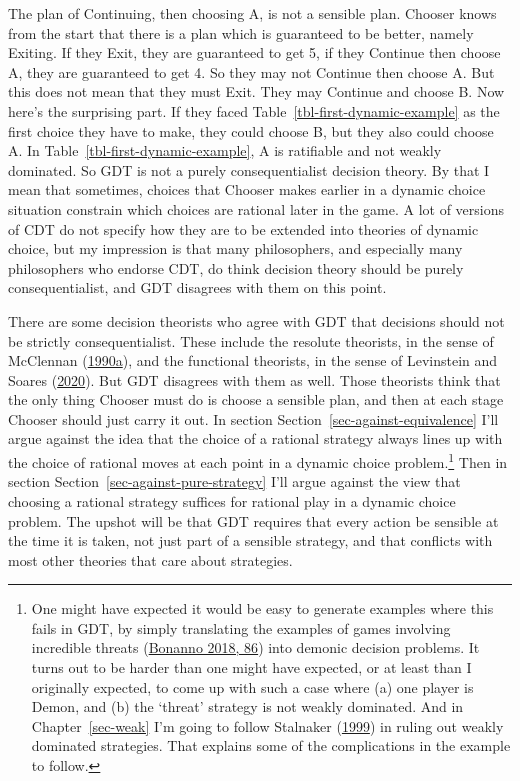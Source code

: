 \documentclass[
  12pt,
  letterpaper,
  DIV=11,
  numbers=noendperiod]{scrreprt}
\begin{document}
The plan of Continuing, then choosing A, is not a sensible plan. Chooser
knows from the start that there is a plan which is guaranteed to be
better, namely Exiting. If they Exit, they are guaranteed to get 5, if
they Continue then choose A, they are guaranteed to get 4. So they may
not Continue then choose A. But this does not mean that they must Exit.
They may Continue and choose B. Now here's the surprising part. If they
faced Table~\ref{tbl-first-dynamic-example} as the first choice they
have to make, they could choose B, but they also could choose A. In
Table~\ref{tbl-first-dynamic-example}, A is ratifiable and not weakly
dominated. So GDT is not a purely consequentialist decision theory. By
that I mean that sometimes, choices that Chooser makes earlier in a
dynamic choice situation constrain which choices are rational later in
the game. A lot of versions of CDT do not specify how they are to be
extended into theories of dynamic choice, but my impression is that many
philosophers, and especially many philosophers who endorse CDT, do think
decision theory should be purely consequentialist, and GDT disagrees
with them on this point.

There are some decision theorists who agree with GDT that decisions
should not be strictly consequentialist. These include the resolute
theorists, in the sense of McClennan
(\protect\hyperlink{ref-McClennan1990}{1990a}), and the functional
theorists, in the sense of Levinstein and Soares
(\protect\hyperlink{ref-LevinsteinSoares2020}{2020}). But GDT disagrees
with them as well. Those theorists think that the only thing Chooser
must do is choose a sensible plan, and then at each stage Chooser should
just carry it out. In section Section~\ref{sec-against-equivalence} I'll
argue against the idea that the choice of a rational strategy always
lines up with the choice of rational moves at each point in a dynamic
choice problem.\footnote{One might have expected it would be easy to
  generate examples where this fails in GDT, by simply translating the
  examples of games involving incredible threats
  (\protect\hyperlink{ref-Bonanno2018}{Bonanno 2018, 86}) into demonic
  decision problems. It turns out to be harder than one might have
  expected, or at least than I originally expected, to come up with such
  a case where (a) one player is Demon, and (b) the `threat' strategy is
  not weakly dominated. And in Chapter~\ref{sec-weak} I'm going to
  follow Stalnaker (\protect\hyperlink{ref-Stalnaker1999}{1999}) in
  ruling out weakly dominated strategies. That explains some of the
  complications in the example to follow.} Then in section
Section~\ref{sec-against-pure-strategy} I'll argue against the view that
choosing a rational strategy suffices for rational play in a dynamic
choice problem. The upshot will be that GDT requires that every action
be sensible at the time it is taken, not just part of a sensible
strategy, and that conflicts with most other theories that care about
strategies.
\end{document}

